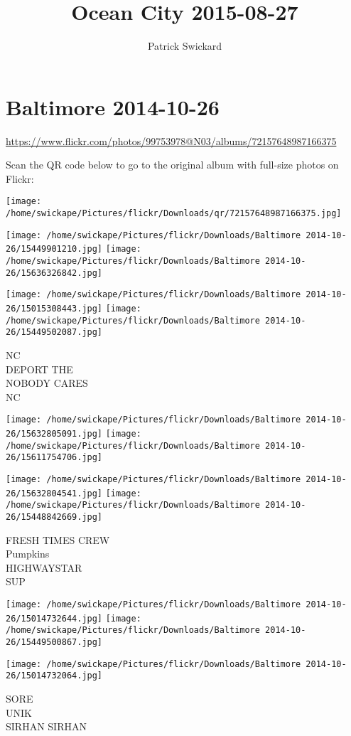 \documentclass[10pt,letterpaper]{article}
\title{Ocean City 2015-08-27}
\author{Patrick Swickard}
\date{}
\begin{document}
\section*{Baltimore 2014-10-26}

\url{https://www.flickr.com/photos/99753978@N03/albums/72157648987166375}

Scan the QR code below to go to the original album with full-size photos on Flickr:

\texttt{[image: /home/swickape/Pictures/flickr/Downloads/qr/72157648987166375.jpg]}
\pagebreak

\texttt{[image: /home/swickape/Pictures/flickr/Downloads/Baltimore 2014-10-26/15449901210.jpg]}
\texttt{[image: /home/swickape/Pictures/flickr/Downloads/Baltimore 2014-10-26/15636326842.jpg]}

\texttt{[image: /home/swickape/Pictures/flickr/Downloads/Baltimore 2014-10-26/15015308443.jpg]}
\texttt{[image: /home/swickape/Pictures/flickr/Downloads/Baltimore 2014-10-26/15449502087.jpg]}

NC\\
DEPORT THE\\
NOBODY CARES\\
NC
\pagebreak

\texttt{[image: /home/swickape/Pictures/flickr/Downloads/Baltimore 2014-10-26/15632805091.jpg]}
\texttt{[image: /home/swickape/Pictures/flickr/Downloads/Baltimore 2014-10-26/15611754706.jpg]}

\texttt{[image: /home/swickape/Pictures/flickr/Downloads/Baltimore 2014-10-26/15632804541.jpg]}
\texttt{[image: /home/swickape/Pictures/flickr/Downloads/Baltimore 2014-10-26/15448842669.jpg]}

FRESH TIMES CREW\\
Pumpkins\\
HIGHWAYSTAR\\
SUP
\pagebreak

\texttt{[image: /home/swickape/Pictures/flickr/Downloads/Baltimore 2014-10-26/15014732644.jpg]}
\texttt{[image: /home/swickape/Pictures/flickr/Downloads/Baltimore 2014-10-26/15449500867.jpg]}

\texttt{[image: /home/swickape/Pictures/flickr/Downloads/Baltimore 2014-10-26/15014732064.jpg]}

SORE\\
UNIK\\
SIRHAN SIRHAN
\pagebreak
\end{document}
